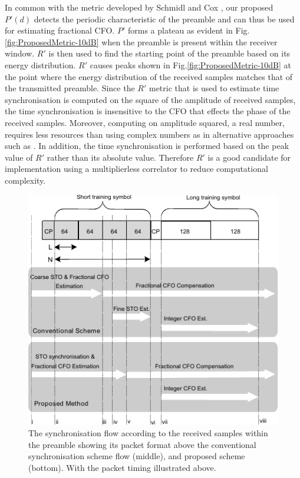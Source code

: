 In common with the metric developed by Schmidl and Cox \cite{Schmidl1997}, our proposed $P'(d)$ detects the periodic characteristic of the preamble and can thus be used for estimating fractional CFO. 
$P'$ forms a plateau as evident in Fig.\ref{fig:ProposedMetric-10dB} when the preamble is present within the receiver window. 
$R'$ is then used to find the starting point of the preamble based on its energy distribution. 
$R'$ causes peaks shown in Fig.\ref{fig:ProposedMetric-10dB} at the point where the energy distribution of the received samples matches that of the transmitted preamble.  
Since the $R'$ metric that is used to estimate time synchronisation is computed on the square of the amplitude of received samples, the time synchronisation is insensitive to the CFO that effects the phase of the received samples.
Moreover, computing on amplitude squared, a real number, requires less resources than using complex numbers as in alternative approaches such as \cite{Kishore2006}.
In addition, the time synchronisation is performed based on the peak value of $R'$ rather than its absolute value. 
Therefore $R'$ is a good candidate for implementation using a multiplierless correlator to reduce computational complexity. 
\begin{figure}
	\centerline{\includegraphics [width=1\columnwidth] {figures/SynFlow_IVMannotated.pdf}}
	\caption{The synchronisation flow according to the received samples within the preamble showing its packet format above the conventional synchronisation scheme flow (middle), and proposed scheme (bottom). With the packet timing illustrated above.}
	\label{fig:SyncFlow}
\end{figure}
